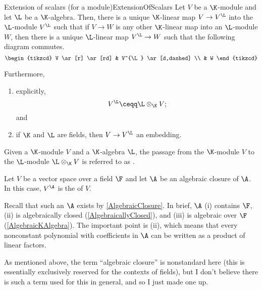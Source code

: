 \begin{thm}{Extension of scalars (for a module)}{ExtensionOfScalars}
	Let $V$ be a $\K$-module and let $\L$ be a $\K$-algebra.  Then, there is a unique $\K$-linear map $V\rightarrow V^{\L}$ into the $\L$-module $V^{\L}$ such that if $V\rightarrow W$ is any other $\K$-linear map into an $\L$-module $W$, then there is a unique $\L$-linear map $V^{\L}\rightarrow W$ such that the following diagram commutes.
	\begin{equation}
		\begin{tikzcd}
			V \ar[r] \ar[rd] & V^{\L} \ar[d,dashed] \\
			& W
		\end{tikzcd}
	\end{equation}

	Furthermore,
	\begin{enumerate}
		\item explicitly,
		\begin{equation}
			V^{\L}\ceqq \L \otimes _{\K}V;
		\end{equation}
		and
		\item if $\K$ and $\L$ are fields, then $V\rightarrow V^{\L}$ an embedding.
	\end{enumerate}
	\begin{rmk}
		Given a $\K$-module $V$ and a $\K$-algebra $\L$, the passage from the $\K$-module $V$ to the $\L$-module $\L \otimes _{\K}V$ is referred to as .
	\end{rmk}
	\begin{rmk}
		Let $V$ be a vector space over a field $\F$ and let $\A$ be an algebraic closure of $\A$.  In this case, $V^{\A}$ is the  of $V$.
		
		Recall that such an $\A$ exists by \cref{AlgebraicClosure}.  In brief, $\A$ (i) contains $\F$, (ii) is algebraically closed (\cref{AlgebraicallyClosed}), and (iii) is algebraic over $\F$ (\cref{AlgebraicKAlgebra}).  The important point is (ii), which means that every nonconstant polynomial with coefficients in $\A$ can be written as a product of linear factors.
		
		As mentioned above, the term ``algebraic closure'' is nonstandard here (this is essentially exclusively reserved for the contexts of fields), but I don't believe there is such a term used for this in general, and so I just made one up.
			

\end{rmk}
\end{thm}
